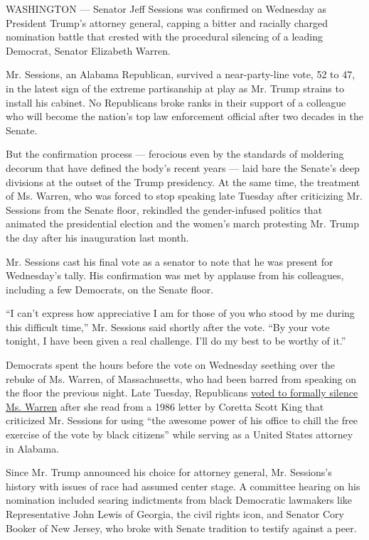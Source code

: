 WASHINGTON --- Senator Jeff Sessions was confirmed on Wednesday as
President Trump's attorney general, capping a bitter and racially
charged nomination battle that crested with the procedural silencing of
a leading Democrat, Senator Elizabeth Warren.

Mr. Sessions, an Alabama Republican, survived a near-party-line vote, 52
to 47, in the latest sign of the extreme partisanship at play as Mr.
Trump strains to install his cabinet. No Republicans broke ranks in
their support of a colleague who will become the nation's top law
enforcement official after two decades in the Senate.

But the confirmation process --- ferocious even by the standards of
moldering decorum that have defined the body's recent years --- laid
bare the Senate's deep divisions at the outset of the Trump presidency.
At the same time, the treatment of Ms. Warren, who was forced to stop
speaking late Tuesday after criticizing Mr. Sessions from the Senate
floor, rekindled the gender-infused politics that animated the
presidential election and the women's march protesting Mr. Trump the day
after his inauguration last month.

Mr. Sessions cast his final vote as a senator to note that he was
present for Wednesday's tally. His confirmation was met by applause from
his colleagues, including a few Democrats, on the Senate floor.

``I can't express how appreciative I am for those of you who stood by me
during this difficult time,'' Mr. Sessions said shortly after the vote.
``By your vote tonight, I have been given a real challenge. I'll do my
best to be worthy of it.''

Democrats spent the hours before the vote on Wednesday seething over the
rebuke of Ms. Warren, of Massachusetts, who had been barred from
speaking on the floor the previous night. Late Tuesday, Republicans
\href{https://www.nytimes.com/2017/02/08/us/politics/elizabeth-warren-coretta-scott-king.html}{voted
to formally silence Ms. Warren} after she read from a 1986 letter by
Coretta Scott King that criticized Mr. Sessions for using ``the awesome
power of his office to chill the free exercise of the vote by black
citizens'' while serving as a United States attorney in Alabama.

Since Mr. Trump announced his choice for attorney general, Mr.
Sessions's history with issues of race had assumed center stage. A
committee hearing on his nomination included searing indictments from
black Democratic lawmakers like Representative John Lewis of Georgia,
the civil rights icon, and Senator Cory Booker of New Jersey, who broke
with Senate tradition to testify against a peer.

